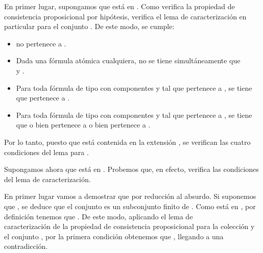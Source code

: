 \begin{isabellebody}
\begin{isamarkuptext}
\begin{demostracion}
   En primer lugar, supongamos que  está en . Como  verifica la propiedad de consistencia 
   proposicional por hipótesis, verifica el lema de caracterización en particular para el conjunto 
   . De este modo, se cumple:
   \begin{itemize}
     \item \isa{{\isasymbottom}} no pertenece a .
     \item Dada  una fórmula atómica cualquiera, no se tiene 
      simultáneamente que\\  y .
     \item Para toda fórmula de tipo \isa{{\isasymalpha}} con componentes  y  tal que \isa{{\isasymalpha}}
      pertenece a , se tiene que  pertenece a .
     \item Para toda fórmula de tipo \isa{{\isasymbeta}} con componentes  y  tal que \isa{{\isasymbeta}}
      pertenece a , se tiene que o bien  pertenece a  o 
      bien  pertenece a .
   \end{itemize} 
  
  Por lo tanto, puesto que  está contenida en la extensión , se verifican las cuatro
  condiciones del lema para .

  Supongamos ahora que  está en . Probemos que, en efecto, verifica las condiciones del lema 
  de caracterización.

  En primer lugar vamos a demostrar que  por reducción al absurdo. Si suponemos que ,
  se deduce que el conjunto \isa{{\isacharbraceleft}{\isasymbottom}{\isacharbraceright}} es un subconjunto finito de . Como  está en , por
  definición tenemos que . De este modo, aplicando el lema de\\ caracterización de la
  propiedad de consistencia proposicional para la colección  y el conjunto \isa{{\isacharbraceleft}{\isasymbottom}{\isacharbraceright}}, por la primera
  condición obtenemos que \isa{{\isasymbottom}\ {\isasymnotin}\ {\isacharbraceleft}{\isasymbottom}{\isacharbraceright}}, llegando a una contradicción.


\end{demostracion}
\end{isamarkuptext}
\end{isabellebody}
